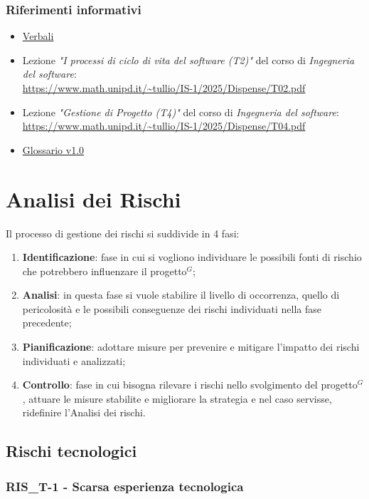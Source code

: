\documentclass[a4paper,10pt]{article}
\begin{document}
\subsubsection{Riferimenti informativi}
\begin{itemize}
  \item \href{https://tool-8.github.io/Documentazione-SWE/}{Verbali}
  \item Lezione \textit{"I processi di ciclo di vita del software (T2)"} del corso di \textit{Ingegneria del software}: \\ \url{https://www.math.unipd.it/~tullio/IS-1/2025/Dispense/T02.pdf}
  \item Lezione \textit{"Gestione di Progetto (T4)"} del corso di \textit{Ingegneria del software}: \\ \url{https://www.math.unipd.it/~tullio/IS-1/2025/Dispense/T04.pdf}
  \item \href{https://tool-8.github.io/Documentazione-SWE/glossario/Glossario.pdf}{Glossario v1.0}
\end{itemize}

\newpage

\section{Analisi dei Rischi}
Il processo di gestione dei rischi si suddivide in 4 fasi:
\begin{enumerate}
  \item \textbf{Identificazione}: fase in cui si vogliono individuare le possibili fonti di rischio che potrebbero influenzare il progetto$^G$;
  \item \textbf{Analisi}: in questa fase si vuole stabilire il livello di occorrenza, quello di pericolosità e le possibili conseguenze dei rischi individuati nella fase precedente;
  \item \textbf{Pianificazione}: adottare misure per prevenire e mitigare l'impatto dei rischi individuati e analizzati;
  \item \textbf{Controllo}: fase in cui bisogna rilevare i rischi nello svolgimento del progetto$^G$, attuare le misure stabilite e migliorare la strategia e nel caso servisse, ridefinire l'Analisi dei rischi.
\end{enumerate}
\subsection{Rischi tecnologici}
\subsubsection{RIS\_T-1 - Scarsa esperienza tecnologica}
\end{document}
